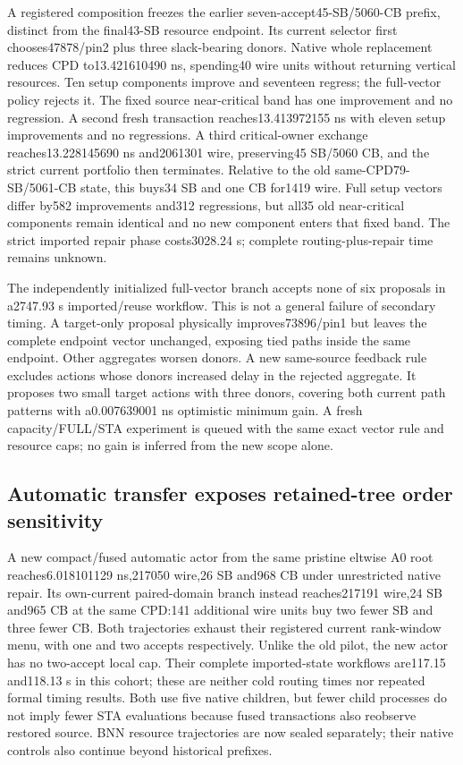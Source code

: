 \documentclass[conference,10pt]{IEEEtran}
\begin{document}
A registered composition freezes the earlier seven-accept45-SB/5060-CB prefix, distinct from the final43-SB resource endpoint. Its current selector first chooses47878/pin2 plus three slack-bearing donors. Native whole replacement reduces CPD to13.421610490 ns, spending40 wire units without returning vertical resources. Ten setup components improve and seventeen regress; the full-vector policy rejects it. The fixed source near-critical band has one improvement and no regression. A second fresh transaction reaches13.413972155 ns with eleven setup improvements and no regressions. A third critical-owner exchange reaches13.228145690 ns and2061301 wire, preserving45 SB/5060 CB, and the strict current portfolio then terminates. Relative to the old same-CPD79-SB/5061-CB state, this buys34 SB and one CB for1419 wire. Full setup vectors differ by582 improvements and312 regressions, but all35 old near-critical components remain identical and no new component enters that fixed band. The strict imported repair phase costs3028.24 s; complete routing-plus-repair time remains unknown.

The independently initialized full-vector branch accepts none of six proposals in a2747.93 s imported/reuse workflow. This is not a general failure of secondary timing. A target-only proposal physically improves73896/pin1 but leaves the complete endpoint vector unchanged, exposing tied paths inside the same endpoint. Other aggregates worsen donors. A new same-source feedback rule excludes actions whose donors increased delay in the rejected aggregate. It proposes two small target actions with three donors, covering both current path patterns with a0.007639001 ns optimistic minimum gain. A fresh capacity/FULL/STA experiment is queued with the same exact vector rule and resource caps; no gain is inferred from the new scope alone.

\subsection{Automatic transfer exposes retained-tree order sensitivity}
A new compact/fused automatic actor from the same pristine eltwise A0 root reaches6.018101129 ns,217050 wire,26 SB and968 CB under unrestricted native repair. Its own-current paired-domain branch instead reaches217191 wire,24 SB and965 CB at the same CPD:141 additional wire units buy two fewer SB and three fewer CB. Both trajectories exhaust their registered current rank-window menu, with one and two accepts respectively. Unlike the old pilot, the new actor has no two-accept local cap. Their complete imported-state workflows are117.15 and118.13 s in this cohort; these are neither cold routing times nor repeated formal timing results. Both use five native children, but fewer child processes do not imply fewer STA evaluations because fused transactions also reobserve restored source. BNN resource trajectories are now sealed separately; their native controls also continue beyond historical prefixes.
\end{document}

